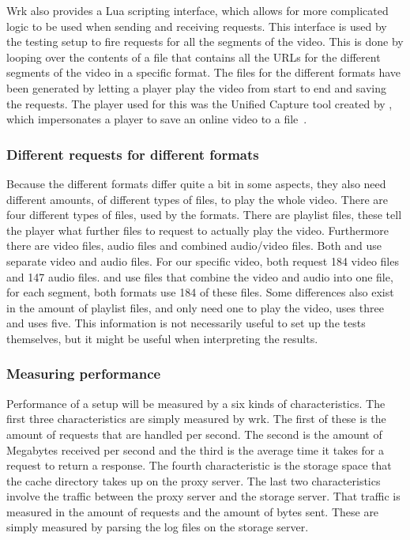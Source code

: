 \documentclass[twoside,openright]{uva-bachelor-thesis}
\begin{document}
Wrk also provides a Lua scripting interface, which allows for more complicated logic
to be used when sending and receiving requests. This interface is used by the testing setup to fire
requests for all the segments of the video. This is done by looping over the
contents of a file that contains all the URLs for the different segments of the
video in a specific format. The files for the different formats have been
generated by letting a player play the video from start to end and saving the
requests. The player used for this was the Unified Capture tool created by \usp,
which impersonates a player to save an online video to a
file~\autocite{uspcapture}.

\subsubsection{Different requests for different formats}\label{sec:filediff}
Because the different \abs formats differ quite a bit in some aspects, they also
need different amounts, of different types of files, to play the whole
video. There are four different types of files, used by the formats. There are
playlist files, these tell the player what further files to request to actually
play the video. Furthermore there are video files, audio files and combined
audio/video files. Both \dash and \iss use separate video and audio files.
For our specific video, both request 184 video files and 147 audio files. \hds
and \hls use files that combine the video and audio into one file, for each
segment, both formats use 184 of these files. Some differences also exist in the
amount of playlist files, \iss and \hds only need one to play the video, \dash
uses three and \hls uses five.  This information is not necessarily useful to
set up the tests themselves, but it might be useful when interpreting the
results.

\subsubsection{Measuring performance}
Performance of a setup will be measured by a six kinds of characteristics. The
first three characteristics are simply measured by wrk. The first of these is
the amount of requests that are handled per second. The second is the amount of
Megabytes received per second and the third is the average time it takes for a
request to return a response. The fourth characteristic is the storage space
that the cache directory takes up on the proxy server. The last two
characteristics involve the traffic between the proxy server and the storage
server. That traffic is measured in the amount of requests and the amount of
bytes sent.  These are simply measured by parsing the log files on the storage
server.
\end{document}
